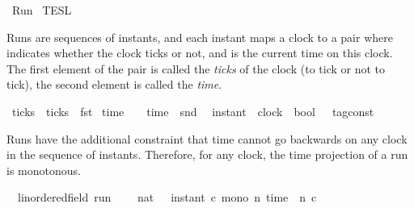 %
\begin{isabellebody}%
%
%
\isadelimdocument
%
\endisadelimdocument
%
\isatagdocument
%
\isamarkuptrue%
%
\endisatagdocument
{\isafolddocument}%
%
\isadelimdocument
%
\endisadelimdocument
%
\isadelimtheory
%
\endisadelimtheory
%
\isatagtheory
{}\isamarkupfalse%
\ Run\isanewline
{}\ TESL\isanewline
\ \ \ \ \ \ \isanewline
{}%
\endisatagtheory
{\isafoldtheory}%
%
\isadelimtheory
%
\endisadelimtheory
%
\begin{isamarkuptext}%
Runs are sequences of instants, and each instant maps a clock to a pair 
   where  indicates whether the clock ticks or not, 
  and  is the current time on this clock.
  The first element of the pair is called the \emph{ticks} of the clock (to tick or 
  not to tick), the second element is called the \emph{time}.%
\end{isamarkuptext}\isamarkuptrue%
\isamarkupfalse%
\ ticks\ \ {\isacartoucheopen}ticks\ {\isasymequiv}\ fst{\isacartoucheclose}\isanewline
{}\isamarkupfalse%
\ time\ \ \ \ {\isacartoucheopen}time\ {\isasymequiv}\ snd{\isacartoucheclose}\isanewline
\isanewline
{}\isamarkupfalse%
\ {\isacharprime}{\isasymtau}\ instant\ {\isacharequal}\ {\isacartoucheopen}clock\ {\isasymRightarrow}\ {\isacharparenleft}bool\ {\isasymtimes}\ {\isacharprime}{\isasymtau}\ tag{\isacharunderscore}const{\isacharparenright}{\isacartoucheclose}%
\begin{isamarkuptext}%
Runs have the additional constraint that time cannot go backwards on any clock
  in the sequence of instants.
  Therefore, for any clock, the time projection of a run is monotonous.%
\end{isamarkuptext}\isamarkuptrue%
\isamarkupfalse%
\ {\isacharparenleft}\ {\isacharprime}{\isasymtau}{\isacharcolon}{\isacharcolon}linordered{\isacharunderscore}field\ run\ {\isacharequal}\isanewline
\ \ {\isacartoucheopen}{\isacharbraceleft}\ {\isasymrho}{\isacharcolon}{\isacharcolon}nat\ {\isasymRightarrow}\ {\isacharprime}{\isasymtau}\ instant{\isachardot}\ {\isasymforall}c{\isachardot}\ mono\ {\isacharparenleft}{\isasymlambda}n{\isachardot}\ time\ {\isacharparenleft}{\isasymrho}\ n\ c{\isacharparenright}{\isacharparenright}\ {\isacharbraceright}{\isacartoucheclose}\isanewline

\end{isabellebody}
